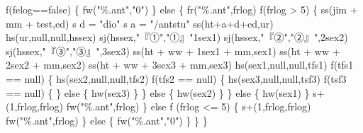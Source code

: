 \documentclass[
]{article}
\newenvironment{Shaded}{}{}
\newcommand{\NormalTok}[1]{#1}
\begin{document}
\begin{Shaded}
\begin{Highlighting}[]

\NormalTok{  f(felog==false)}
\NormalTok{  \{}
\NormalTok{    fw("\%.ant","0")}
\NormalTok{  \}}
\NormalTok{  else}
\NormalTok{  \{}
\NormalTok{    fr("\%.ant",frlog)}
\NormalTok{    f(frlog \textgreater{} 5)}
\NormalTok{    \{}
\NormalTok{  	ss(jim + mm + test,ed)}
\NormalTok{      s d = "dio"}
\NormalTok{      s a = "/antstu"}
\NormalTok{      ss(ht+a+d+ed,ur)}
\NormalTok{      hs(ur,null,null,hssex)}
\NormalTok{      sj(hssex,"『①","①』"1sex1)}
\NormalTok{      sj(hssex,"『②","②』",2sex2)}
\NormalTok{      sj(hssex,"『③","③』",3sex3)}
\NormalTok{      ss(ht + ww + 1sex1 + mm,sex1)}
\NormalTok{      ss(ht + ww + 2sex2 + mm,sex2)}
\NormalTok{      ss(ht + ww + 3sex3 + mm,sex3)}
\NormalTok{      hs(sex1,null,null,tfs1)}
\NormalTok{      f(tfs1 == null)}
\NormalTok{      \{}
\NormalTok{        hs(sex2,null,null,tfs2)}
\NormalTok{        f(tfs2 == null)}
\NormalTok{        \{}
\NormalTok{          hs(sex3,null,null,tsf3)}
\NormalTok{          f(tsf3 == null)}
\NormalTok{          \{}
\NormalTok{          \}}
\NormalTok{          else}
\NormalTok{          \{}
\NormalTok{            hw(sex3)}
\NormalTok{          \}}
\NormalTok{        \}}
\NormalTok{        else}
\NormalTok{        \{}
\NormalTok{          hw(sex2)}
\NormalTok{        \}}
\NormalTok{      \}}
\NormalTok{      else}
\NormalTok{      \{}
\NormalTok{        hw(sex1)}
\NormalTok{      \}}
\NormalTok{      s+(1,frlog,frlog)}
\NormalTok{      fw("\%.ant",frlog)}
\NormalTok{    \}}
\NormalTok{    else f (frlog \textless{}= 5)}
\NormalTok{    \{}
\NormalTok{      s+(1,frlog,frlog)}
\NormalTok{      fw("\%.ant",frlog)}
\NormalTok{    \}}
\NormalTok{    else}
\NormalTok{    \{}
\NormalTok{      fw("\%.ant","0")}
\NormalTok{    \}}
\NormalTok{  \}}
\NormalTok{\}}



\end{Highlighting}
\end{Shaded}
\end{document}
